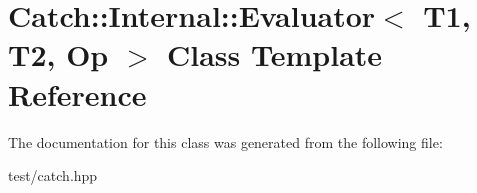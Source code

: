 \hypertarget{classCatch_1_1Internal_1_1Evaluator}{}\section{Catch\+:\+:Internal\+:\+:Evaluator$<$ T1, T2, Op $>$ Class Template Reference}
\label{classCatch_1_1Internal_1_1Evaluator}


The documentation for this class was generated from the following file\+:\begin{DoxyCompactItemize}
\item 
test/catch.\+hpp\end{DoxyCompactItemize}

